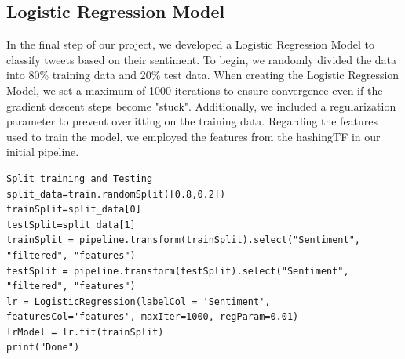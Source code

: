 \documentclass[11pt,a4paper]{article}
\begin{document}
\subsection{Logistic Regression Model}
In the final step of our project, we developed a Logistic Regression Model to classify tweets based on their sentiment.
To begin, we randomly divided the data into 80\% training data and 20\% test data. When creating the Logistic Regression Model, we set a maximum of 1000 iterations to ensure convergence even if the gradient descent steps become "stuck". Additionally, we included a regularization parameter to prevent overfitting on the training data.
Regarding the features used to train the model, we employed the features from the hashingTF in our initial pipeline.
\newpage
\begin{lstlisting}
Split training and Testing
split_data=train.randomSplit([0.8,0.2])
trainSplit=split_data[0]
testSplit=split_data[1]
trainSplit = pipeline.transform(trainSplit).select("Sentiment", "filtered", "features")
testSplit = pipeline.transform(testSplit).select("Sentiment", "filtered", "features")
lr = LogisticRegression(labelCol = 'Sentiment', featuresCol='features', maxIter=1000, regParam=0.01)
lrModel = lr.fit(trainSplit)
print("Done")
\end{lstlisting}
\end{document}
